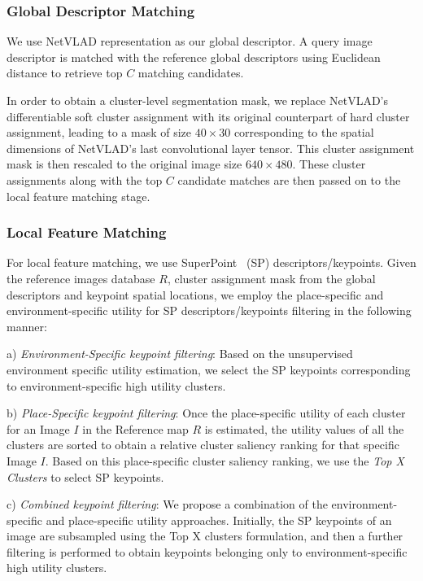 \documentclass[letterpaper, 10 pt, conference]{ieeeconf}  \fi
\begin{document}
\subsubsection{Global Descriptor Matching}
\label{sec:GDM}
We use NetVLAD representation as our global descriptor. A query image descriptor is matched with the reference global descriptors using Euclidean distance to retrieve top $C$ matching candidates.

In order to obtain a cluster-level segmentation mask, we replace NetVLAD's differentiable soft cluster assignment with its original counterpart of hard cluster assignment, leading to a mask of size $40\times30$ corresponding to the spatial dimensions of NetVLAD's last convolutional layer tensor. This cluster assignment mask is then rescaled to the original image size $640\times480$. These cluster assignments along with the top $C$ candidate matches are then passed on to the local feature matching stage.

\subsubsection{Local Feature Matching}
\label{sec:LFM}
For local feature matching, we use SuperPoint~\cite{detone2018superpoint} (SP) descriptors/keypoints. Given the reference images database $R$, cluster assignment mask from the global descriptors and keypoint spatial locations, we employ the place-specific and environment-specific utility for SP descriptors/keypoints filtering in the following manner:

a) \textit{Environment-Specific keypoint filtering}: Based on the unsupervised environment specific utility estimation, we select the SP keypoints corresponding to environment-specific high utility clusters.

b) \textit{Place-Specific keypoint filtering}: Once the place-specific utility of each cluster for an Image $I$ in the Reference map $R$ is estimated, the utility values of all the clusters are sorted to obtain a relative cluster saliency ranking for that specific Image $I$. Based on this place-specific cluster saliency ranking, we use the \textit{Top X Clusters} to select SP keypoints.

c) \textit{Combined keypoint filtering}: We propose a combination of the environment-specific and place-specific utility approaches. Initially, the SP keypoints of an image are subsampled using the Top X clusters formulation, and then a further filtering is performed to obtain keypoints belonging only to environment-specific high utility clusters.
\end{document}
